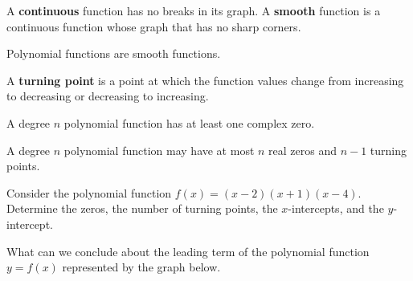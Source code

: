 \begin{definition}
  A \textbf{continuous} function has no breaks in its graph. A \textbf{smooth} function is a continuous function whose graph that has no sharp corners.
\end{definition}
\begin{note}
  Polynomial functions are smooth functions.
\end{note}


\begin{definition}
  A \textbf{turning point} is a point at which the function values change from increasing to decreasing or decreasing to increasing.
\end{definition}

\begin{theorem}
  A degree $n$ polynomial function has at least one complex zero.
\end{theorem}

\begin{proposition}
  A degree $n$ polynomial function may have at most $n$ real zeros and $n-1$ turning points.
\end{proposition}

\newpage

\begin{example}
  Consider the polynomial function  $f(x)=(x-2)(x+1)(x-4)$. Determine the zeros, the number of turning points, the $x$-intercepts, and the $y$-intercept.
\end{example}

\begin{example}
  What can we conclude about the leading term of the polynomial function $y=f(x)$ represented by the graph below.\\
\end{example}
\vspace*{-0.4\textheight}


